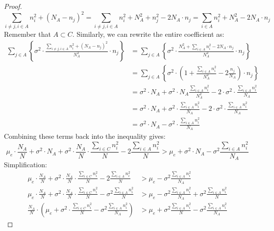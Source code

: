 \documentclass{article}
\newcommand{\p}[1]{\left( #1 \right)}
\newcommand{\cb}[1]{\left\{ #1 \right\}}
\newcommand{\cd}[0]{\cdot}
\newcommand{\mue}[0]{\ensuremath{\mu_e}}
\newcommand{\var}[0]{\ensuremath{\sigma^2}}
\newcommand{\ndraw}[0]{\ensuremath{n}}
\newcommand{\total}[0]{\ensuremath{N}}
\newcommand{\col}[0]{\ensuremath{C}}
\newcommand{\colA}[0]{\ensuremath{A}}
\begin{document}
\begin{proof}
$$\sum_{i\ne j, i \in \colA}\ndraw_i^2 + (\total_\colA - \ndraw_j)^2 = \sum_{i\ne j, i \in \colA}\ndraw_i^2 + \total_\colA^2 + \ndraw_j^2 - 2 \total_\colA \cd \ndraw_j = \sum_{i \in \colA} \ndraw_i^2+ \total_\colA^2 - 2 \total_\colA \cd \ndraw_j$$
Remember that $\colA \subset \col$. Similarly, we can rewrite the entire coefficient as: 
\begin{align*}
 \sum_{j \in \colA}\cb{\var\cd  \frac{\sum_{i\ne j, i \in \colA}\ndraw_i^2 + (\total_\colA - \ndraw_j)^2}{\total_\colA^2} \cd \ndraw_j }&= \sum_{j \in \colA}\cb{\var \cd \frac{\total_\colA^2 + \sum_{i \in \colA}\ndraw_i^2 - 2 \total_\colA \cd \ndraw_j}{\total_\colA^2} \cd \ndraw_j}\\
&=\sum_{j \in \colA}\cb{\var \cd \p{1 + \frac{\sum_{i \in \colA} \ndraw_i^2}{\total_\colA^2} - 2 \frac{\ndraw_j}{\total_\colA}} \cd \ndraw_j }\\
&= \var \cd \total_\colA + \var \cd \total_\colA \frac{\sum_{i \in \colA} \ndraw_i^2}{\total_\colA^2} - 2\cd \var \cd  \frac{\sum_{i \in \colA}\ndraw_i^2}{\total_\colA} \\
&=\var \cd \total_\colA + \var \cd \frac{\sum_{i \in \colA} \ndraw_i^2}{\total_\colA} - 2\cd \var \cd  \frac{\sum_{i \in \colA}\ndraw_i^2}{\total_\colA}\\
&= \var \cd \total_\colA - \var \cd  \frac{\sum_{i \in \colA}\ndraw_i^2}{\total_\colA}
\end{align*}
Combining these terms back into the inequality gives: 
$$\mue \cd \frac{\total_\colA}{\total} + \var \cd \total_\colA + \var \cd \frac{\total_{\colA}}{\total} \cd \frac{\sum_{i \in \col} \ndraw_i^2}{\total} - 2 \frac{\sum_{i \in \colA} \ndraw_i^2}{\total} > \mue + \var \cd \total_\colA - \var \frac{\sum_{i \in \colA} \ndraw_i^2}{\total_\colA}$$
Simplification: 
\begin{align*}
\mue \cd \frac{\total_\colA}{\total} + \var \cd \frac{\total_{\colA}}{\total} \cd \frac{\sum_{i \in \col} \ndraw_i^2}{\total} - 2 \frac{\sum_{i \in \colA} \ndraw_i^2}{\total} &> \mue - \var \frac{\sum_{i \in \colA} \ndraw_i^2}{\total_\colA}\\
\mue \cd \frac{\total_\colA}{\total} + \var \cd \frac{\total_{\colA}}{\total} \cd \frac{\sum_{i \in \col} \ndraw_i^2}{\total} - \var \frac{\sum_{i \in \colA} \ndraw_i^2}{\total} &> \mue - \var \frac{\sum_{i \in \colA} \ndraw_i^2}{\total_\colA} +  \var \frac{\sum_{i \in \colA} \ndraw_i^2}{\total}\\
\frac{\total_\colA}{\total} \cd \p{\mue + \var \cd \frac{\sum_{i \in \col} \ndraw_i^2}{\total} - \var \frac{\sum_{i \in \colA} \ndraw_i^2}{\total_\colA}} &> \mue +  \var \frac{\sum_{i \in \colA} \ndraw_i^2}{\total}- \var \frac{\sum_{i \in \colA} \ndraw_i^2}{\total_\colA}

\end{align*}
\end{proof}
\end{document}
